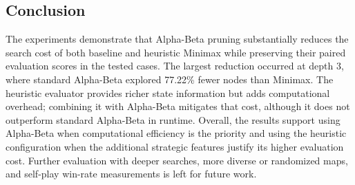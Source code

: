 \subsection{Conclusion}
The experiments demonstrate that Alpha-Beta pruning substantially reduces the search cost of both baseline and heuristic Minimax while preserving their paired evaluation scores in the tested cases. The largest reduction occurred at depth 3, where standard Alpha-Beta explored 77.22\% fewer nodes than Minimax. The heuristic evaluator provides richer state information but adds computational overhead; combining it with Alpha-Beta mitigates that cost, although it does not outperform standard Alpha-Beta in runtime. Overall, the results support using Alpha-Beta when computational efficiency is the priority and using the heuristic configuration when the additional strategic features justify its higher evaluation cost. Further evaluation with deeper searches, more diverse or randomized maps, and self-play win-rate measurements is left for future work.
